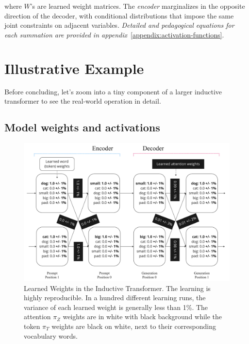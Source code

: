 \documentclass{article}
\begin{document}
where $W$'s are learned weight matrices. The \emph{encoder} marginalizes in the opposite direction of the decoder, with conditional distributions that impose the same joint constraints on adjacent variables.  \emph{Detailed and pedagogical equations for each summation are provided in appendix}~\ref{appendix:activation-functions}.


\section{Illustrative Example}

Before concluding, let's zoom into a tiny component of a larger inductive transformer to see the real-world operation in detail.

\subsection{Model weights and activations}

\begin{figure}[H]
    \begin{center}
    \includegraphics[width=\textwidth]{figures/results_factor_graph_with_weights.pdf}
    \caption{Learned Weights in the Inductive Transformer. The learning is highly reproducible. In a hundred different learning runs, the variance of each learned weight is generally less than 1\%. The attention $\pi_Z$ weights are in white with black background while the token $\pi_T$ weights are black on white, next to their corresponding vocabulary words.}
    \label{fig:result-weights}
    \end{center}
\end{figure}
\end{document}
